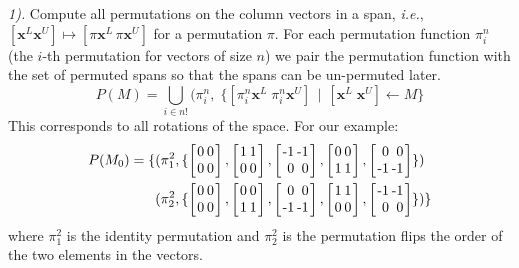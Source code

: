 \documentclass[9pt]{sigplanconf}
\theoremstyle{definition}
\newcommand{\ie}{\emph{i.e.}}
\newcommand{\vect}[1]{\textbf{#1}}
\newcommand{\vtwo}[2]{\setlength{\arraycolsep}{0em}
\left[\begin{array}{l}#1\\#2\end{array}\right]}
\newcommand{\stwo}[4]
{\setlength{\arraycolsep}{0.1em}
\left[\begin{array}{rr}$#1$ & $#3$\\$#2$ & $#4$\end{array}\right]}
\begin{document}
\noindent
\textit{1).\;} Compute all permutations on the column vectors in a span, \ie{},
  $[\vect{x}^L \vect{x}^U] \mapsto [\pi\vect{x}^L \, \pi\vect{x}^U]$
for a permutation $\pi$. For each permutation function $\pi^n_i$
(the $i$-th permutation for vectors of size $n$) we pair the
permutation function with the set of permuted spans so that
the spans can be un-permuted later.
%
\begin{equation*}
P(M) = \bigcup_{i \in n!} (\pi^n_{i} , \; \{[\pi^n_i
\vect{x}^L \; \pi^n_i\vect{x}^U] \, \mid \, [\vect{x}^L \; \vect{x}^U]
\leftarrow M\}
\end{equation*}
%
This corresponds to all rotations of the space.  For our example:
%
\begin{align*}
P(M_0) =
\{&(\pi^2_1, \{ \stwo{0}{0}{0}{0},
\stwo{1}{0}{1}{0},
\stwo{-1}{0}{-1}{0},
\stwo{0}{1}{0}{1},
\stwo{0}{-1}{0}{-1} \})
\\
&(\pi^2_2, \{
 \stwo{0}{0}{0}{0},
 \stwo{0}{1}{0}{1},
 \stwo{0}{-1}{0}{-1},
 \stwo{1}{0}{1}{0},
 \stwo{-1}{0}{-1}{0}\})\}
\end{align*}
%
where $\pi^2_1$ is the identity permutation and $\pi^2_2$ is the
permutation flips the order of the two elements in the 
vectors. \\
\end{document}
